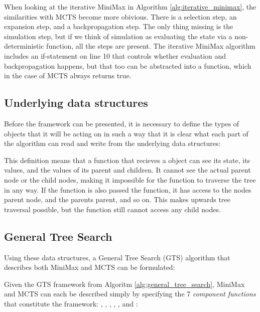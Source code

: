 

When looking at the iterative MiniMax in Algorithm \ref{alg:iterative_minimax}, the similarities with MCTS become more obivious. There is a selection step, an expansion step, and a backpropagation step. The only thing missing is the simulation step, but if we think of simulation as evaluating the state via a non-deterministic function, all the steps are present. The iterative MiniMax algorithm includes an if-statement on line 10 that controls whether evaluation and backpropagation happens, but that too can be abstracted into a  function, which in the case of MCTS always returns true. 

\subsection{Underlying data structures}

Before the framework can be presented, it is necessary to define the types of objects that it will be acting on in such a way that it is clear what each part of the algorithm can read and write from the underlying data structures:



\newpage
This definition means that a function that recieves a  object can see its state, its values, and the values of its parent and children. It cannot see the actual parent node or the child nodes, making it impossible for the function to traverse the tree in any way. If the function is also passed the  function, it has access to the nodes parent node, and the parents parent, and so on. This makes upwards tree traversal possible, but the function still cannot access any child nodes.

\subsection{General Tree Search}

Using these data structures, a General Tree Search (GTS) algorithm that describes both MiniMax and MCTS can be formulated:



Given the GTS framework from Algoritm \ref{alg:general_tree_search}, MiniMax and MCTS can each be described simply by specifying the 7 \textit{component functions} that constitute the framework: , , , , , and :

